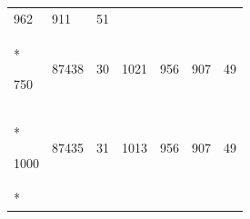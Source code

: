 \documentclass[
  12pt,
  oneside,
  openany]{book}
\begin{document}
\begin{appendices}
\begin{singlespace}
\begin{longtable}[]{@{}lllllll@{}}
\begin{minipage}[t]{0.07\columnwidth}
962\strut
\end{minipage} & \begin{minipage}[t]{0.07\columnwidth}\raggedright
911\strut
\end{minipage} & \begin{minipage}[t]{0.10\columnwidth}\raggedright
51\strut
\end{minipage}\tabularnewline*
\begin{minipage}[t]{0.13\columnwidth}\raggedright
750\strut
\end{minipage} & \begin{minipage}[t]{0.16\columnwidth}\raggedright
87438\strut
\end{minipage} & \begin{minipage}[t]{0.16\columnwidth}\raggedright
30\strut
\end{minipage} & \begin{minipage}[t]{0.11\columnwidth}\raggedright
1021\strut
\end{minipage} & \begin{minipage}[t]{0.07\columnwidth}\raggedright
956\strut
\end{minipage} & \begin{minipage}[t]{0.07\columnwidth}\raggedright
907\strut
\end{minipage} & \begin{minipage}[t]{0.10\columnwidth}\raggedright
49\strut
\end{minipage}\tabularnewline*
\begin{minipage}[t]{0.13\columnwidth}\raggedright
1000\strut
\end{minipage} & \begin{minipage}[t]{0.16\columnwidth}\raggedright
87435\strut
\end{minipage} & \begin{minipage}[t]{0.16\columnwidth}\raggedright
31\strut
\end{minipage} & \begin{minipage}[t]{0.11\columnwidth}\raggedright
1013\strut
\end{minipage} & \begin{minipage}[t]{0.07\columnwidth}\raggedright
956\strut
\end{minipage} & \begin{minipage}[t]{0.07\columnwidth}\raggedright
907\strut
\end{minipage} & \begin{minipage}[t]{0.10\columnwidth}\raggedright
49\strut
\end{minipage}\tabularnewline*

\end{longtable}
\end{singlespace}
\end{appendices}
\end{document}
